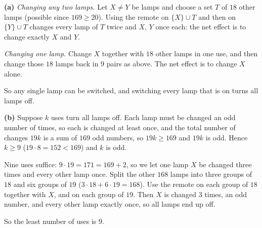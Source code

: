 \textbf{(a)} \emph{Changing any two lamps.} Let $X\ne Y$ be lamps and choose a set $T$ of $18$ other lamps (possible since $169\ge20$). Using the remote on $\{X\}\cup T$ and then on $\{Y\}\cup T$ changes every lamp of $T$ twice and $X$, $Y$ once each: the net effect is to change exactly $X$ and $Y$.

\emph{Changing one lamp.} Change $X$ together with $18$ other lamps in one use, and then change those $18$ lamps back in $9$ pairs as above. The net effect is to change $X$ alone.

So any single lamp can be switched, and switching every lamp that is on turns all lamps off.

\textbf{(b)} Suppose $k$ uses turn all lamps off. Each lamp must be changed an odd number of times, so each is changed at least once, and the total number of changes $19k$ is a sum of $169$ odd numbers, so $19k\ge169$ and $19k$ is odd. Hence $k\ge9$ ($19\cdot8=152<169$) and $k$ is odd.

Nine uses suffice: $9\cdot19=171=169+2$, so we let one lamp $X$ be changed three times and every other lamp once. Split the other $168$ lamps into three groups of $18$ and six groups of $19$ ($3\cdot18+6\cdot19=168$). Use the remote on each group of $18$ together with $X$, and on each group of $19$. Then $X$ is changed $3$ times, an odd number, and every other lamp exactly once, so all lamps end up off.

So the least number of uses is $\boxed{9}$.
